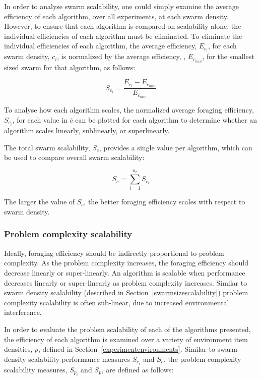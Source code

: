 In order to analyse swarm scalability, one could simply examine the average efficiency of each algorithm, over all experiments, at each swarm density. However, to ensure that each algorithm is compared on scalability alone, the individual efficiencies of each algorithm must be eliminated. To eliminate the individual efficiencies of each algorithm, the average efficiency, $E_{c_i}$, for each swarm density, $c_i$, is normalized by the average efficiency, , $E_{c_{min}}$, for the smallest sized swarm for that algorithm, as follows: 

\begin{equation}
S_{c_i} = \dfrac{E_{c_{i}} - E_{c_{min}}}{E_{c_{min}}}
\end{equation}


To analyse how each algorithm scales, the normalized average foraging efficiency, $S_{c_i}$, for each value in $\overline{c}$ can be plotted for each algorithm to determine whether an algorithm scales linearly, sublinearly, or superlinearly. 

The total swarm scalability, $S_c$, provides a single value per algorithm, which can be used to compare overall swarm scalability:

\begin{equation}
	S_c = \sum_{i=1}^{n_c} S_{c_i}
\end{equation}


The larger the value of $S_c$, the better foraging efficiency scales with respect to swarm density. 



\subsubsection{Problem complexity scalability}
\label{setup:problemscalability}

Ideally, foraging efficiency should be indirectly proportional to problem complexity. As the problem complexity increases, the foraging efficiency should decrease linearly or super-linearly. An algorithm is scalable when performance decreases linearly or super-linearly as problem complexity increases. Similar to swarm density scalability (described in Section~\ref{swarmsizescalability}) problem complexity scalability is often sub-linear, due to increased environmental interference. 

In order to evaluate the problem scalability of each of the algorithms presented, the efficiency of each algorithm is examined over a variety of environment item densities, $p$, defined in Section~\ref{experimentenvironments}. Similar to swarm density scalability performance measures $S_{c_i}$ and $S_c$, the problem complexity scalability measures, $S_{p_i}$ and $S_p$, are defined as follows:

